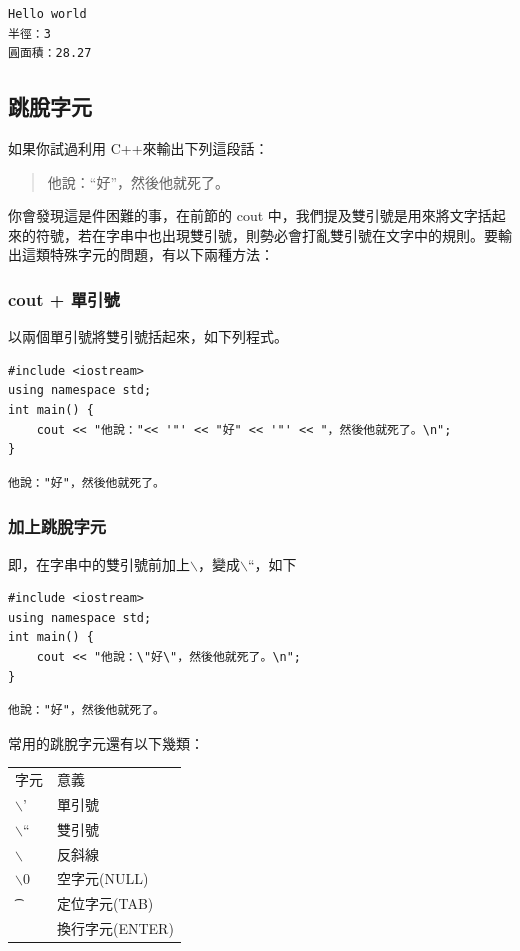 \documentclass[12pt,a4paper]{article}
\begin{document}
\begin{verbatim}
Hello world
半徑：3
圓面積：28.27
\end{verbatim}

\subsection{跳脫字元}
\label{sec:org19f68bc}
如果你試過利用 C++來輸出下列這段話：
\begin{verse}
他說：``好''，然後他就死了。\\
\end{verse}
你會發現這是件困難的事，在前節的 cout 中，我們提及雙引號是用來將文字括起來的符號，若在字串中也出現雙引號，則勢必會打亂雙引號在文字中的規則。要輸出這類特殊字元的問題，有以下兩種方法：
\subsubsection{cout + 單引號}
\label{sec:orgd402165}
以兩個單引號將雙引號括起來，如下列程式。
\lstset{breaklines=true,language=cpp,label= ,caption= ,captionpos=b,firstnumber=1,numbers=left}
\begin{lstlisting}
#include <iostream>
using namespace std;
int main() {
    cout << "他說："<< '"' << "好" << '"' << "，然後他就死了。\n";
}
\end{lstlisting}

\begin{verbatim}
他說："好"，然後他就死了。
\end{verbatim}
\subsubsection{加上跳脫字元}
\label{sec:org3fc4b4a}
即，在字串中的雙引號前加上$\backslash$，變成$\backslash$``，如下
\lstset{breaklines=true,language=cpp,label= ,caption= ,captionpos=b,firstnumber=1,numbers=left}
\begin{lstlisting}
#include <iostream>
using namespace std;
int main() {
    cout << "他說：\"好\"，然後他就死了。\n";
}
\end{lstlisting}

\begin{verbatim}
他說："好"，然後他就死了。
\end{verbatim}


常用的跳脫字元還有以下幾類：
\begin{center}
\begin{tabular}{ll}
字元 & 意義\\
$\backslash$' & 單引號\\
$\backslash$`` & 雙引號\\
$\backslash$\ & 反斜線\\
$\backslash$0 & 空字元(NULL)\\
\t & 定位字元(TAB)\\
\n & 換行字元(ENTER)\\
\end{tabular}
\end{center}
\end{document}
